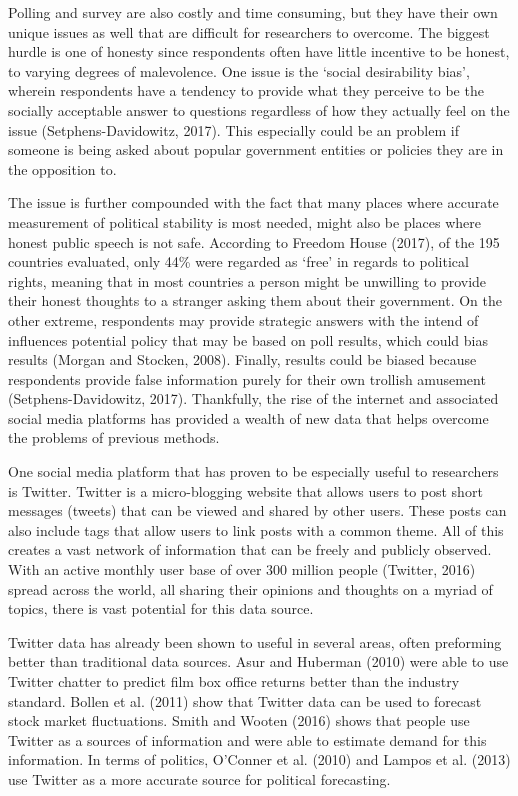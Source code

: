 \documentclass[12pt]{article}
\begin{document}
\begin{spacing}{1.5}
Polling and survey are also costly and time consuming, but they have their own unique issues as well that are difficult for researchers to overcome. The biggest hurdle is one of honesty since respondents often have little incentive to be honest, to varying degrees of malevolence. One issue is the `social desirability bias', wherein respondents have a tendency to provide what they perceive to be the socially acceptable answer to questions regardless of how they actually feel on the issue (Setphens-Davidowitz, 2017). This especially could be an problem if someone is being asked about popular government entities or policies they are in the opposition to. 

The issue is further compounded with the fact that many places where accurate measurement of political stability is most needed, might also be places where honest public speech is not safe. According to Freedom House (2017), of the 195 countries evaluated, only 44\% were regarded as `free' in regards to political rights, meaning that in most countries a person might be unwilling to provide their honest thoughts to a stranger asking them about their government. On the other extreme, respondents may provide strategic answers with the intend of influences potential policy that may be based on poll results, which could bias results (Morgan and Stocken, 2008). Finally, results could be biased because respondents provide false information purely for their own trollish amusement (Setphens-Davidowitz, 2017). Thankfully, the rise of the internet and associated social media platforms has provided a wealth of new data that helps overcome the problems of previous methods. 

One social media platform that has proven to be especially useful to researchers is Twitter. Twitter is a micro-blogging website that allows users to post short messages (tweets) that can be viewed and shared by other users. These posts can also include tags that allow users to link posts with a common theme. All of this creates a vast network of information that can be freely and publicly observed. With an active monthly user base of over 300 million people (Twitter, 2016) spread across the world, all sharing their opinions and thoughts on a myriad of topics, there is vast potential for this data source. 

Twitter data has already been shown to useful in several areas, often preforming better than traditional data sources. Asur and Huberman (2010) were able to use Twitter chatter to predict film box office returns better than the industry standard. Bollen et al. (2011) show that Twitter data can be used to forecast stock market fluctuations. Smith and Wooten (2016) shows that people use Twitter as a sources of information and were able to estimate demand for this information. In terms of politics, O'Conner et al. (2010) and Lampos et al. (2013) use Twitter as a more accurate source for political forecasting. 


\end{spacing}
\end{document}
